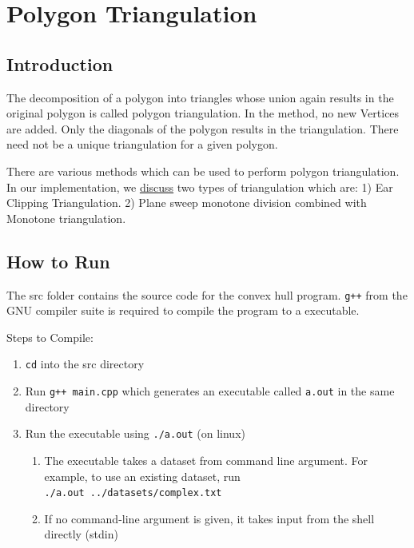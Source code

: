 \hypertarget{polygon-triangulation}{%
\section{Polygon Triangulation}\label{polygon-triangulation}}

\hypertarget{introduction}{%
\subsection{Introduction}\label{introduction}}

The decomposition of a polygon into triangles whose union again results
in the original polygon is called polygon triangulation. In the method,
no new Vertices are added. Only the diagonals of the polygon results in
the triangulation. There need not be a unique triangulation for a given
polygon.

There are various methods which can be used to perform polygon
triangulation. In our implementation, we
\protect\hyperlink{algorithm-approach}{discuss} two types of
triangulation which are: 1) Ear Clipping Triangulation. 2) Plane sweep
monotone division combined with Monotone triangulation.

\hypertarget{how-to-run}{%
\subsection{How to Run}\label{how-to-run}}

The src folder contains the source code for the convex hull program.
\texttt{g++} from the GNU compiler suite is required to compile the
program to a executable.

Steps to Compile:

\begin{enumerate}
\def\labelenumi{\arabic{enumi})}
\tightlist
\item
  \texttt{cd} into the src directory
\item
  Run \texttt{g++\ main.cpp} which generates an executable called
  \texttt{a.out} in the same directory
\item
  Run the executable using \texttt{./a.out} (on linux)

  \begin{enumerate}
  \def\labelenumii{\arabic{enumii})}
  \tightlist
  \item
    The executable takes a dataset from command line argument. For
    example, to use an existing dataset, run
    \texttt{./a.out\ ../datasets/complex.txt}
  \item
    If no command-line argument is given, it takes input from the shell
    directly (stdin)
  \end{enumerate}
\end{enumerate}

